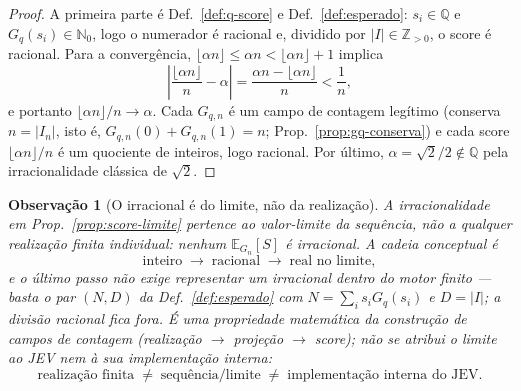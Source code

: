 \documentclass[11pt,a4paper]{article}
\newtheorem{observacao}{Observação}
\begin{document}
\begin{proof}
A primeira parte é Def.~\ref{def:q-score} e Def.~\ref{def:esperado}:
\(s_i\in\mathbb Q\) e \(G_q(s_i)\in\mathbb N_0\), logo o numerador é racional e,
dividido por \(\lvert I\rvert\in\mathbb Z_{>0}\), o score é racional. Para a
convergência, \(\lfloor\alpha n\rfloor\le\alpha n<\lfloor\alpha n\rfloor+1\)
implica
\[
\left\lvert\frac{\lfloor\alpha n\rfloor}{n}-\alpha\right\rvert
=\frac{\alpha n-\lfloor\alpha n\rfloor}{n}<\frac1n,
\]
e portanto \(\lfloor\alpha n\rfloor/n\to\alpha\). Cada \(G_{q,n}\) é um campo de
contagem legítimo (conserva \(n=\lvert I_n\rvert\), isto é,
\(G_{q,n}(0)+G_{q,n}(1)=n\); Prop.~\ref{prop:gq-conserva}) e cada score
\(\lfloor\alpha n\rfloor/n\) é um quociente de inteiros, logo racional. Por
último, \(\alpha=\sqrt2/2\notin\mathbb Q\) pela irracionalidade clássica de
\(\sqrt2\).
\end{proof}

\begin{observacao}[O irracional é do limite, não da realização]
\label{obs:score-limite}
A irracionalidade em Prop.~\ref{prop:score-limite} pertence ao
\emph{valor-limite} da sequência, não a qualquer realização finita individual:
nenhum \(\mathbb E_{G_n}[S]\) é irracional. A cadeia conceptual é
\[
\boxed{
\text{inteiro}
\;\longrightarrow\;
\text{racional}
\;\longrightarrow\;
\text{real no limite},
}
\]
e o último passo não exige representar um irracional dentro do motor finito —
basta o par \((N,D)\) da Def.~\ref{def:esperado} com \(N=\sum_i s_iG_q(s_i)\)
e \(D=\lvert I\rvert\); a divisão racional fica fora. É uma propriedade
matemática da construção de campos de contagem (realização \(\to\) projeção
\(\to\) score); não se atribui o limite ao JEV nem à sua implementação interna:
\[
\boxed{
\text{realização finita}
\;\neq\;
\text{sequência/limite}
\;\neq\;
\text{implementação interna do JEV}.
}
\]
\end{observacao}
\end{document}
